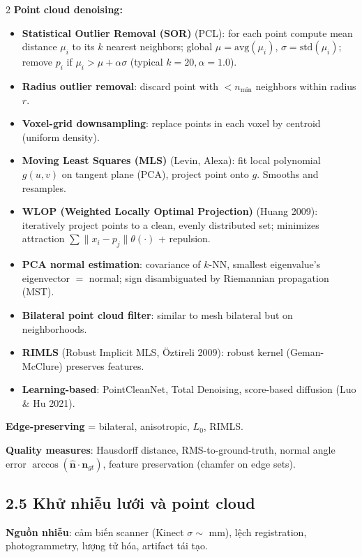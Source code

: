 \begin{paracol}{2}
\textbf{Point cloud denoising:}
\begin{itemize}[leftmargin=*,nosep]
  \item \textbf{Statistical Outlier Removal (SOR)} (PCL): for each point compute mean distance $\mu_i$ to its $k$ nearest neighbors; global $\mu=\mathrm{avg}(\mu_i)$, $\sigma=\mathrm{std}(\mu_i)$; remove $p_i$ if $\mu_i>\mu+\alpha\sigma$ (typical $k=20,\alpha=1.0$).
  \item \textbf{Radius outlier removal}: discard point with $<n_{\min}$ neighbors within radius $r$.
  \item \textbf{Voxel-grid downsampling}: replace points in each voxel by centroid (uniform density).
  \item \textbf{Moving Least Squares (MLS)} (Levin, Alexa): fit local polynomial $g(u,v)$ on tangent plane (PCA), project point onto $g$. Smooths and resamples.
  \item \textbf{WLOP (Weighted Locally Optimal Projection)} (Huang 2009): iteratively project points to a clean, evenly distributed set; minimizes attraction $\sum\|x_i-p_j\|\theta(\cdot)$ + repulsion.
  \item \textbf{PCA normal estimation}: covariance of $k$-NN, smallest eigenvalue's eigenvector $=$ normal; sign disambiguated by Riemannian propagation (MST).
  \item \textbf{Bilateral point cloud filter}: similar to mesh bilateral but on neighborhoods.
  \item \textbf{RIMLS} (Robust Implicit MLS, Öztireli 2009): robust kernel (Geman-McClure) preserves features.
  \item \textbf{Learning-based}: PointCleanNet, Total Denoising, score-based diffusion (Luo \& Hu 2021).
\end{itemize}

\textbf{Edge-preserving} = bilateral, anisotropic, $L_0$, RIMLS.

\textbf{Quality measures}: Hausdorff distance, RMS-to-ground-truth, normal angle error $\arccos(\hat{\mathbf n}\!\cdot\!\mathbf n_{gt})$, feature preservation (chamfer on edge sets).

\switchcolumn

\subsection*{2.5 Khử nhiễu lưới và point cloud}

\textbf{Nguồn nhiễu}: cảm biến scanner (Kinect $\sigma\sim$ mm), lệch registration, photogrammetry, lượng tử hóa, artifact tái tạo.


\end{paracol}
